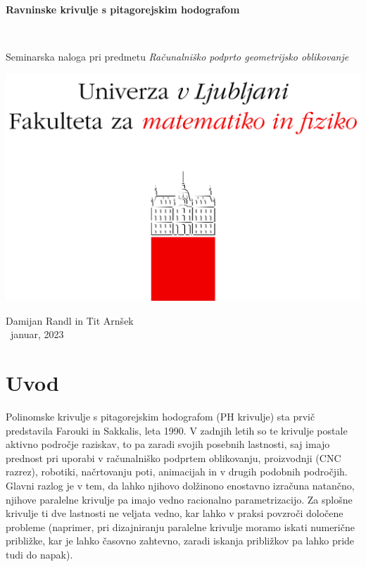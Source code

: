 \documentclass[12pt]{article}
\begin{document}
\thispagestyle{empty}
\begin{center}
\begin{Large}
{\bf Ravninske krivulje s pitagorejskim hodografom}
\end{Large}
\\[5mm]
\begin{large}
Seminarska naloga pri predmetu {\em Računalniško podprto geometrijsko oblikovanje }
\\[5mm]
\begin{center}
	\includegraphics{fmf.png}	
\end{center}
\vspace*{\fill}

{\sc Damijan Randl in Tit Arnšek}
\\[10mm]
~januar, 2023
\end{large}

\end{center}

\newpage
\tableofcontents
\newpage
\setcounter{page}{1}

\section{Uvod}
Polinomske krivulje s pitagorejskim hodografom (PH krivulje) sta prvič predstavila Farouki in Sakkalis, leta 1990.
V zadnjih letih so te krivulje postale aktivno področje raziskav,
to pa zaradi svojih posebnih lastnosti, 
saj imajo prednost pri uporabi v računalniško podprtem oblikovanju,
proizvodnji (CNC razrez), robotiki, načrtovanju poti, animacijah in v drugih 
podobnih področjih. Glavni razlog je v tem, da lahko njihovo dolžinono enostavno izračuna natančno,
njihove paralelne krivulje pa imajo vedno racionalno parametrizacijo.
\newline
Za splošne krivulje ti dve lastnosti ne veljata vedno, 
kar lahko v praksi povzroči določene probleme (naprimer, pri dizajniranju paralelne krivulje 
moramo iskati numerične približke, kar je lahko časovno zahtevno,
zaradi iskanja približkov pa lahko pride tudi do napak).
\end{document}
